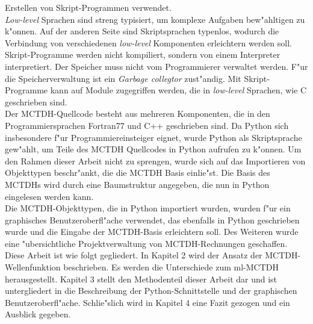 Erstellen von Skript-Programmen verwendet. \cite{PyBook} 
\\\textit{Low-level} Sprachen sind streng typisiert, um komplexe Aufgaben bew"ahltigen zu k"onnen. 
Auf der anderen Seite sind Skriptsprachen typenlos, wodurch die Verbindung von verschiedenen \textit{low-level} Komponenten erleichtern werden soll. \cite{PyBook2} 
Skript-Programme werden nicht kompiliert, sondern von einem Interpreter interpretiert. 
Der Speicher muss nicht vom Programmierer verwaltet werden. F"ur die Speicherverwaltung ist ein
\textit{Garbage collegtor} zust"andig.
 Mit Skript-Programme kann auf Module zugegriffen werden, die in \textit{low-level} Sprachen,
 wie C geschrieben sind. \cite{PyKana}     
 \\Der MCTDH-Quellcode besteht aus mehreren Komponenten, die in den Programmiersprachen Fortran77 und C++ geschrieben sind.
 Da Python sich insbesondere f"ur Programmier\-einsteiger eignet, wurde Python als Skriptsprache gew"ahlt, um Teile des MCTDH Quellcodes in Python aufrufen
zu k"onnen. Um den Rahmen dieser Arbeit nicht zu sprengen, wurde sich auf das Importieren von Objekttypen beschr"ankt, 
die die MCTDH Basis einlie"st. Die Basis des MCTDHs wird durch eine Baumstruktur angegeben, die nun in Python eingelesen werden kann.
\\Die MCTDH-Objekttypen, die in Python importiert wurden, wurden f"ur ein graphisches Benutzeroberfl"ache verwendet, das ebenfalls in
Python geschrieben wurde und die Eingabe der MCTDH-Basis erleichtern soll. Des Weiteren wurde eine "ubersichtliche Projektverwaltung 
von MCTDH-Rechnungen geschaffen.  
\\Diese Arbeit ist wie folgt gegliedert. In Kapitel 2 wird der Ansatz der MCTDH-Wellenfunktion beschrieben. Es werden die Unterschiede zum ml-MCTDH herausgestellt.
Kapitel 3 stellt den Methodenteil dieser Arbeit dar und ist untergliedert in die Beschreibung der Python-Schnittstelle und der graphischen Benutzeroberfl"ache.     
Schlie"slich wird in Kapitel 4 eine Fazit gezogen und ein Ausblick gegeben.     